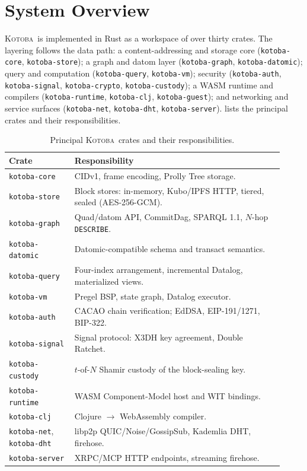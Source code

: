 \documentclass[11pt]{article}
\newcommand{\kotoba}{\textsc{Kotoba}}
\begin{document}
\section{System Overview}
\label{sec:overview}

\kotoba\ is implemented in Rust as a workspace of over thirty crates. The
layering follows the data path: a content-addressing and storage core
(\texttt{kotoba-core}, \texttt{kotoba-store}); a graph and datom layer
(\texttt{kotoba-graph}, \texttt{kotoba-datomic}); query and computation
(\texttt{kotoba-query}, \texttt{kotoba-vm}); security
(\texttt{kotoba-auth}, \texttt{kotoba-signal}, \texttt{kotoba-crypto},
\texttt{kotoba-custody}); a WASM runtime and compilers
(\texttt{kotoba-runtime}, \texttt{kotoba-clj}, \texttt{kotoba-guest}); and
networking and service surfaces (\texttt{kotoba-net}, \texttt{kotoba-dht},
\texttt{kotoba-server}).  lists the principal crates and their
responsibilities.

\begin{table}[t]
\centering
\small
\caption{Principal \kotoba\ crates and their responsibilities.}
\label{tab:crates}
\begin{tabular}{@{}p{0.22\linewidth} p{0.70\linewidth}@{}}
\toprule
\textbf{Crate} & \textbf{Responsibility} \\
\midrule
\texttt{kotoba-core}    & CIDv1, frame encoding, Prolly Tree storage. \\
\texttt{kotoba-store}   & Block stores: in-memory, Kubo/IPFS HTTP, tiered, sealed (AES-256-GCM). \\
\texttt{kotoba-graph}   & Quad/datom API, CommitDag, SPARQL 1.1, $N$-hop \texttt{DESCRIBE}. \\
\texttt{kotoba-datomic} & Datomic-compatible schema and transact semantics. \\
\texttt{kotoba-query}   & Four-index arrangement, incremental Datalog, materialized views. \\
\texttt{kotoba-vm}      & Pregel BSP, state graph, Datalog executor. \\
\texttt{kotoba-auth}    & CACAO chain verification; EdDSA, EIP-191/1271, BIP-322. \\
\texttt{kotoba-signal}  & Signal protocol: X3DH key agreement, Double Ratchet. \\
\texttt{kotoba-custody} & $t$-of-$N$ Shamir custody of the block-sealing key. \\
\texttt{kotoba-runtime} & WASM Component-Model host and WIT bindings. \\
\texttt{kotoba-clj}     & Clojure $\rightarrow$ WebAssembly compiler. \\
\texttt{kotoba-net}, \texttt{kotoba-dht} & libp2p QUIC/Noise/GossipSub, Kademlia DHT, firehose. \\
\texttt{kotoba-server}  & XRPC/MCP HTTP endpoints, streaming firehose. \\
\bottomrule
\end{tabular}
\end{table}
\end{document}
